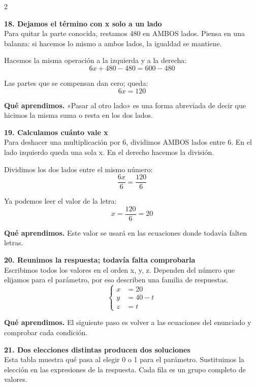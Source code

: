 \documentclass[11pt,a4paper,landscape]{article}
\begin{document}
\begin{multicols*}{2}
\noindent\begin{minipage}{\linewidth}\textbf{18. Dejamos el término con x solo a un lado}\\[2pt]Para quitar la parte conocida, restamos 480 en AMBOS lados. Piensa en una balanza: si hacemos lo mismo a ambos lados, la igualdad se mantiene.
\par\smallskip Hacemos la misma operación a la izquierda y a la derecha:
\[6x + 480 - 480=600 - 480\]
\par\smallskip Las partes que se compensan dan cero; queda:
\[6x=120\]
\par\smallskip\textbf{Qué aprendimos.} «Pasar al otro lado» es una forma abreviada de decir que hicimos la misma suma o resta en los dos lados.
\end{minipage}\par\medskip
\noindent\begin{minipage}{\linewidth}\textbf{19. Calculamos cuánto vale x}\\[2pt]Para deshacer una multiplicación por 6, dividimos AMBOS lados entre 6. En el lado izquierdo queda una sola x. En el derecho hacemos la división.
\par\smallskip Dividimos los dos lados entre el mismo número:
\[\frac{6x}{6}=\frac{120}{6}\]
\par\smallskip Ya podemos leer el valor de la letra:
\[x=\frac{120}{6}=20\]
\par\smallskip\textbf{Qué aprendimos.} Este valor se usará en las ecuaciones donde todavía falten letras.
\end{minipage}\par\medskip
\noindent\begin{minipage}{\linewidth}\textbf{20. Reunimos la respuesta; todavía falta comprobarla}\\[2pt]Escribimos todos los valores en el orden x, y, z. Dependen del número que elijamos para el parámetro, por eso describen una familia de respuestas.
\[\left\{\begin{aligned}x&=20\\y&=40 - t\\z&=t\end{aligned}\right.\]
\par\smallskip\textbf{Qué aprendimos.} El siguiente paso es volver a las ecuaciones del enunciado y comprobar cada condición.
\end{minipage}\par\medskip
\noindent\begin{minipage}{\linewidth}\textbf{21. Dos elecciones distintas producen dos soluciones}\\[2pt]Esta tabla muestra qué pasa al elegir 0 o 1 para el parámetro. Sustituimos la elección en las expresiones de la respuesta. Cada fila es un grupo completo de valores.

\end{minipage}
\end{multicols*}
\end{document}
